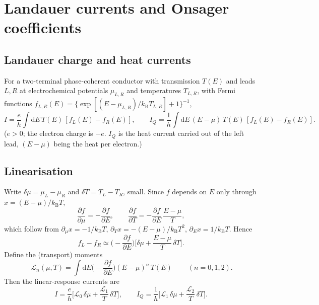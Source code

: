 \documentclass[11pt]{article}
\newcommand{\dd}{\mathrm{d}}
\newcommand{\kB}{k_{\mathrm B}}
\newcommand{\Lloc}{\mathcal{L}}
\begin{document}
\section{Landauer currents and Onsager coefficients}

\subsection{Landauer charge and heat currents}
For a two-terminal phase-coherent conductor with transmission $T(E)$ and leads $L,R$ at
electrochemical potentials $\mu_{L,R}$ and temperatures $T_{L,R}$, with Fermi functions
$f_{L,R}(E)=\{\exp[(E-\mu_{L,R})/\kB T_{L,R}]+1\}^{-1}$,
\begin{equation}
I=\frac{e}{h}\int\!\dd E\,T(E)\,[f_L(E)-f_R(E)],\qquad
I_Q=\frac{1}{h}\int\!\dd E\,(E-\mu)\,T(E)\,[f_L(E)-f_R(E)].
\end{equation}
($e>0$; the electron charge is $-e$. $I_Q$ is the heat current carried out of the left lead,
$(E-\mu)$ being the heat per electron.)

\subsection{Linearisation}
Write $\delta\mu=\mu_L-\mu_R$ and $\delta T=T_L-T_R$, small. Since $f$ depends on $E$ only through
$x=(E-\mu)/\kB T$,
\begin{equation}
\frac{\partial f}{\partial\mu}=-\frac{\partial f}{\partial E},\qquad
\frac{\partial f}{\partial T}=-\frac{\partial f}{\partial E}\,\frac{E-\mu}{T},
\end{equation}
which follow from $\partial_\mu x=-1/\kB T$, $\partial_T x=-(E-\mu)/\kB T^2$, $\partial_E x=1/\kB T$.
Hence
\begin{equation}
f_L-f_R\simeq\Big(-\frac{\partial f}{\partial E}\Big)\Big[\delta\mu+\frac{E-\mu}{T}\,\delta T\Big].
\end{equation}
Define the (transport) moments
\begin{equation}
\boxed{\ \Lloc_n(\mu,T)=\int\!\dd E\Big(-\frac{\partial f}{\partial E}\Big)(E-\mu)^n\,T(E)\ }
\qquad(n=0,1,2).
\end{equation}
Then the linear-response currents are
\begin{equation}
I=\frac{e}{h}\Big[\Lloc_0\,\delta\mu+\frac{\Lloc_1}{T}\,\delta T\Big],\qquad
I_Q=\frac{1}{h}\Big[\Lloc_1\,\delta\mu+\frac{\Lloc_2}{T}\,\delta T\Big].
\end{equation}
\end{document}
